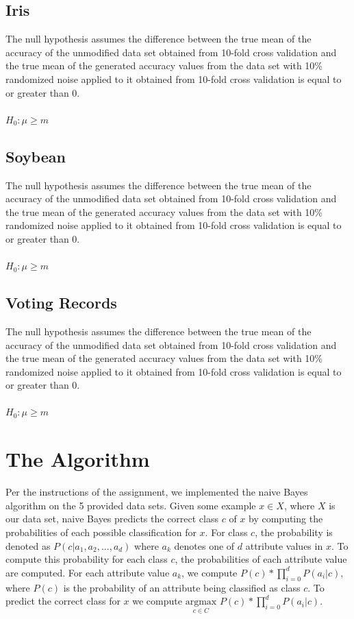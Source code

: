 \documentclass[twoside,11pt]{article}
\begin{document}
\subsection{Iris} The null hypothesis assumes the difference between the true mean of the accuracy of the unmodified data set obtained from 10-fold cross validation and the true mean of the generated accuracy values from the data set with 10\% randomized noise applied to it obtained from 10-fold cross validation is equal to or greater than 0.\\\\
$H_0 : \mu \geq m$

\subsection{Soybean} The null hypothesis assumes the difference between the true mean of the accuracy of the unmodified data set obtained from 10-fold cross validation and the true mean of the generated accuracy values from the data set with 10\% randomized noise applied to it obtained from 10-fold cross validation is equal to or greater than 0.\\\\
$H_0 : \mu \geq m$

\subsection{Voting Records} The null hypothesis assumes the difference between the true mean of the accuracy of the unmodified data set obtained from 10-fold cross validation and the true mean of the generated accuracy values from the data set with 10\% randomized noise applied to it obtained from 10-fold cross validation is equal to or greater than 0.\\\\
$H_0 : \mu \geq m$

\section{The Algorithm}
Per the instructions of the assignment, we implemented the naive Bayes algorithm on the 5 provided data sets. Given some example $x \in X$, where $X$ is our data set, naive Bayes predicts the correct class $c$ of $x$ by computing the probabilities of each possible classification for $x$. For class $c$, the probability is denoted as $P(c | a_1, a_2,...,a_d)$ where $a_k$ denotes one of $d$ attribute values in $x$. To compute this probability for each class $c$, the probabilities of each attribute value are computed. For each attribute value $a_k$, we compute $P(c) * \prod^d_{i=0} P(a_i | c)$, where $P(c)$ is the probability of an attribute being classified as class $c$. To predict the correct class for $x$ we compute $\underset{c \in C}{\mathrm{argmax}}$ $P(c) * \prod^d_{i=0} P(a_i | c)$.
\end{document}

